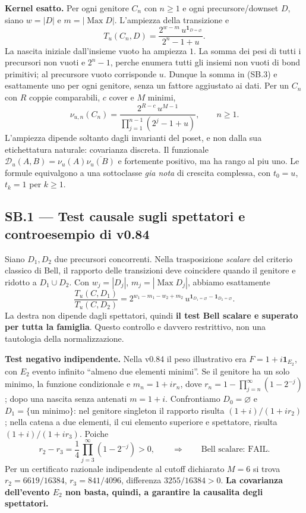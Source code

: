 \documentclass[11pt,a4paper]{article}
\begin{document}
\textbf{Kernel esatto.} Per ogni genitore $C_n$ con $n\ge1$ e ogni precursore/downset $D$, siano $w=|D|$ e $m=|\operatorname{Max}D|$. L'ampiezza della transizione e
\begin{equation}
 \boxed{T_u(C_n,D)=\frac{2^{w-m}\,u^{\mathbf1_{D=\varnothing}}}
 {2^n-1+u}.}\tag{SB.3}
\end{equation}
La nascita iniziale dall'insieme vuoto ha ampiezza $1$. La somma dei pesi di tutti i precursori non vuoti e $2^n-1$, perche enumera tutti gli insiemi non vuoti di bond primitivi; al precursore vuoto corrisponde $u$. Dunque la somma in (SB.3) e esattamente uno per ogni genitore, senza un fattore aggiustato ai dati. Per un $C_n$ con $R$ coppie comparabili, $c$ cover e $M$ minimi,
\begin{equation}
 \boxed{\nu_{u,n}(C_n)=\frac{2^{R-c}\,u^{M-1}}
 {\prod_{j=1}^{n-1}(2^j-1+u)},\qquad n\ge1.}\tag{SB.4}
\end{equation}
L'ampiezza dipende soltanto dagli invarianti del poset, e non dalla sua etichettatura naturale: covarianza discreta. Il funzionale $\mathcal D_u(A,B)=\nu_u(A)\overline{\nu_u(B)}$ e fortemente positivo, ma ha rango al piu uno. Le formule equivalgono a una sottoclasse \emph{gia nota} di crescita complessa, con $t_0=u$, $t_k=1$ per $k\ge1$.

\clearpage
\subsection*{SB.1 --- Test causale sugli spettatori e controesempio di v0.84}
Siano $D_1,D_2$ due precursori concorrenti. Nella trasposizione \emph{scalare} del criterio classico di Bell, il rapporto delle transizioni deve coincidere quando il genitore e ridotto a $D_1\cup D_2$. Con $w_j=|D_j|$, $m_j=|\operatorname{Max}D_j|$, abbiamo esattamente
\begin{equation}
 \boxed{\frac{T_u(C,D_1)}{T_u(C,D_2)}
 =2^{w_1-m_1-w_2+m_2}\,
 u^{\mathbf1_{D_1=\varnothing}-\mathbf1_{D_2=\varnothing}}.}\tag{SB.5}
\end{equation}
La destra non dipende dagli spettatori, quindi \textbf{il test Bell scalare e superato per tutta la famiglia}. Questo controllo e davvero restrittivo, non una tautologia della normalizzazione.

\textbf{Test negativo indipendente.} Nella v0.84 il peso illustrativo era $F=1+i\mathbf1_{E_2}$, con $E_2$ evento infinito ``almeno due elementi minimi''. Se il genitore ha un solo minimo, la funzione condizionale e $m_n=1+i r_n$, dove $r_n=1-\prod_{j=n}^{\infty}(1-2^{-j})$; dopo una nascita senza antenati $m=1+i$. Confrontiamo $D_0=\varnothing$ e $D_1=\{\text{un minimo}\}$: nel genitore singleton il rapporto risulta $(1+i)/(1+ir_2)$; nella catena a due elementi, il cui elemento superiore e spettatore, risulta $(1+i)/(1+ir_3)$. Poiche
\begin{equation}
 \boxed{r_2-r_3=\frac14\prod_{j=3}^{\infty}(1-2^{-j})>0,}
 \qquad\Rightarrow\qquad \text{Bell scalare: FAIL}.\tag{SB.6}
\end{equation}
Per un certificato razionale indipendente al cutoff dichiarato $M=6$ si trova $r_2=6619/16384$, $r_3=841/4096$, differenza $3255/16384>0$. \textbf{La covarianza dell'evento $E_2$ non basta, quindi, a garantire la causalita degli spettatori.}
\end{document}

